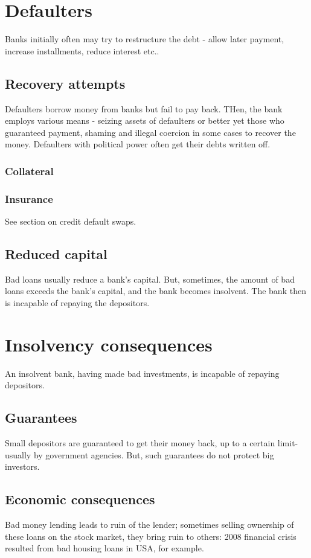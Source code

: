 \documentclass[oneside, article]{memoir}
\begin{document}
\section{Defaulters}
Banks initially often may try to restructure the debt - allow later payment, increase installments, reduce interest etc..

\subsection{Recovery attempts}
Defaulters borrow money from banks but fail to pay back. THen, the bank employs various means - seizing assets of defaulters or better yet those who guaranteed payment, shaming and illegal coercion in some cases to recover the money. Defaulters with political power often get their debts written off.

\subsubsection{Collateral}
\tbc

\subsubsection{Insurance}
See section on credit default swaps.

\subsection{Reduced capital}
Bad loans usually reduce a bank's capital. But, sometimes, the amount of bad loans exceeds the bank's capital, and the bank becomes insolvent. The bank then is incapable of repaying the depositors.

\section{Insolvency consequences}
An insolvent bank, having made bad investments, is incapable of repaying depositors.

\subsection{Guarantees}
Small depositors are guaranteed to get their money back, up to a certain limit- usually by government agencies.  But, such guarantees do not protect big investors.

\subsection{Economic consequences}
Bad money lending leads to ruin of the lender; sometimes selling ownership of these loans on the stock market, they bring ruin to others: 2008 financial crisis resulted from bad housing loans in USA, for example.
\end{document}
